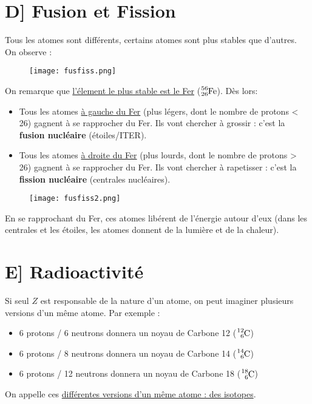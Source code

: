 \documentclass[a4paper]{article}
\begin{document}
\begin{Large}
\newpage
\section*{D] Fusion et Fission}
Tous les atomes sont différents, certains atomes sont plus stables que d'autres. On observe :
\begin{figure}[H]
\vspace*{-0.4cm}
\begin{center}
\texttt{[image: fusfiss.png]} 
\end{center}
\end{figure}
\vspace*{-0.6cm}
On remarque que \underline{l'élement le plus stable est le Fer} ($\ce{^{56}_{26}Fe}$). Dès lors:
\begin{itemize}
\item Tous les atomes \underline{à gauche du Fer} (plus légers, dont le nombre de protons < 26) gagnent à se rapprocher du Fer. Ils vont chercher à grossir : c'est la \textbf{fusion nucléaire} (étoiles/ITER).
\item Tous les atomes \underline{à droite du Fer} (plus lourds, dont le nombre de protons > 26) gagnent à se rapprocher du Fer. Ils vont chercher à rapetisser : c'est la \textbf{fission nucléaire} (centrales nucléaires).
\end{itemize}

\begin{figure}[H]
\vspace*{-1cm}
\begin{center}
\texttt{[image: fusfiss2.png]} 
\end{center}
\end{figure}
\vspace*{-0.7cm}
\noindent En se rapprochant du Fer, ces atomes libérent de l'énergie autour d'eux (dans les centrales et les étoiles, les atomes donnent de la lumière et de la chaleur).

\section*{E] Radioactivité}
Si seul $Z$ est responsable de la nature d'un atome, on peut imaginer plusieurs versions d'un même atome. Par exemple :
\begin{itemize}
\item 6 protons / 6 neutrons donnera un noyau de Carbone 12 ($\ce{^{12}_6C}$)
\item 6 protons / 8 neutrons donnera un noyau de Carbone 14 ($\ce{^{14}_6C}$)
\item 6 protons / 12 neutrons donnera un noyau de Carbone 18 ($\ce{^{18}_6C}$)
\end{itemize}
On appelle ces \underline{différentes versions d'un même atome : des isotopes}.\\


\end{Large}
\end{document}
